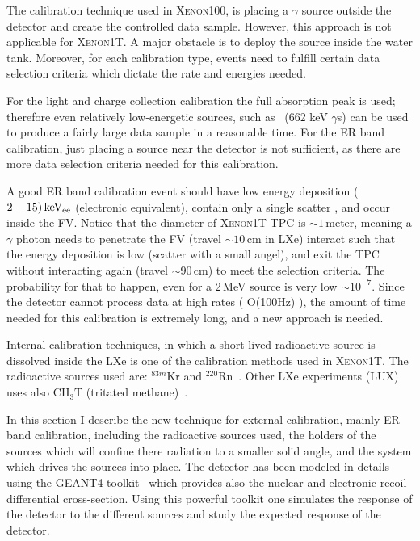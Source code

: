 The calibration technique used in \textsc{Xenon100}, is placing a $\gamma$ source outside the detector and create the controlled data sample. However, this approach is not applicable for \textsc{Xenon1T}. A major obstacle is to deploy the source inside the water tank. Moreover, for each calibration type, events need to fulfill certain data selection criteria which dictate the rate and energies needed. 

For the light and charge collection calibration the full absorption peak is used; therefore even relatively low-energetic sources, such as \Cs\ (662 keV $\gamma$s) can be used to produce a fairly large data sample in a reasonable time. For the ER band calibration, just placing a source near the detector is not sufficient, as there are more data selection criteria needed for this calibration. 

A good ER band calibration event should have low energy deposition ($2-15)\,\mathrm{keV_\mathrm{ee}}$ (electronic equivalent), contain only a single scatter , and occur inside the FV. Notice that the diameter of \textsc{Xenon1T} TPC is $\sim 1$\,meter, meaning a $\gamma$ photon needs to penetrate the FV (travel $\sim 10$\,cm in LXe) interact such that the energy deposition is low (scatter with a small angel), and exit the TPC without interacting again (travel $\sim 90$\,cm) to meet the selection criteria. The probability for that to happen, even for a 2\,MeV source is very low $\sim 10^{-7}$. Since the detector cannot process data at high rates ( O(100Hz) ), the amount of time needed for this calibration is extremely long, and a new approach is needed.

Internal calibration techniques, in which a short lived radioactive source is dissolved inside the LXe is one of the calibration methods used in \textsc{Xenon1T}. The radioactive sources used are: $^{83m}\mathrm{Kr}$ and $^{220}\mathrm{Rn}$~\cite{Aprile:2016pmc,Aprile:2017aty}. Other LXe experiments (LUX) uses also $\mathrm{CH_3T}$ (tritated methane)~\cite{Akerib:2015wdi}.    


In this section I describe the new technique for external calibration, mainly ER band calibration, including the radioactive sources used, the holders of the sources which will confine there radiation to a smaller solid angle, and the system which drives the sources into place. The detector has been modeled in details using the GEANT4 toolkit~\cite{AGOSTINELLI2003250} which provides also the nuclear and electronic recoil differential cross-section. Using this powerful toolkit one simulates the response of the detector to the different sources and study the expected response of the detector. 



